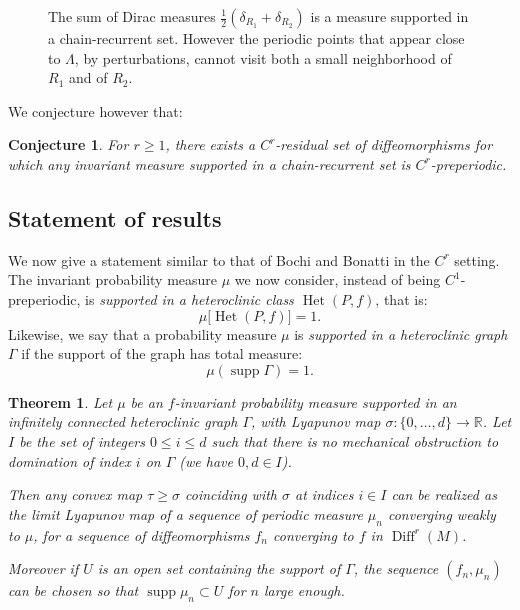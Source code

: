 \documentclass[11pt, a4paper]{amsart}
\theoremstyle{plain}
\newtheorem{theorem}{Theorem} %
\newtheorem{conjecture}{Conjecture}[proposition]
\theoremstyle{definition}
\theoremstyle{remark}
\numberwithin{equation}{section}         %
\DeclareMathOperator{\Diff}{{Diff}}
\DeclareMathOperator*{\supp}{supp}
\def\Diff{\operatorname{Diff}}
\def\Het{\operatorname{Het}}
\begin{document}
\begin{figure}%
\begin{center}
\def\svgwidth{100pt}           %

\end{center}
\caption{\small The sum of Dirac measures $\frac{1}{2}(\delta_{R_1}+\delta_{R_2})$ is a measure supported in a chain-recurrent set. However the periodic points that appear close to $\Lambda$, by perturbations, cannot visit both a small neighborhood of $R_1$ and of $R_2$.}
\label{f.counterex4}
\end{figure} 

We conjecture however that:

\begin{conjecture}
For $r\geq 1$, there exists a $C^r$-residual set of diffeomorphisms for which any invariant measure supported in a chain-recurrent set is $C^r$-preperiodic. 
 \end{conjecture}


\subsection{Statement of results} We now give a statement similar to that of Bochi and Bonatti in the $C^r$ setting. The  invariant probability measure $\mu$ we now consider, instead of being $C^1$-preperiodic, is {\em supported in a heteroclinic class $\Het(P,f)$}, that is:
$$\mu\bigl[\Het(P,f)\bigr]=1.$$
Likewise, we say that a probability measure $\mu$ is {\em supported in a heteroclinic graph $\Gamma$} if the support of the graph has total measure:
 $$\mu(\supp \Gamma)=1.$$
 
 
\begin{theorem}\label{t.bobocr}
Let $\mu$ be an $f$-invariant probability measure supported in an infinitely connected heteroclinic graph $\Gamma$, with Lyapunov map $\sigma\colon \{0,\ldots,d\}\to \mathbb{R}$. Let $I$ be the set of integers $0\leq i\leq d$ such that there is no mechanical obstruction to domination of index $i$ on $\Gamma$ (we have $0,d\in I$). 

Then any convex map $\tau\geq \sigma$ coinciding with $\sigma$ at indices $i\in I$ can be realized as the limit Lyapunov map of a sequence of periodic measure $\mu_n$ converging weakly to $\mu$, for a sequence of diffeomorphisms $f_n$ converging to $f$ in $\Diff^r(M)$.

Moreover if $U$ is an open set containing the support of $\Gamma$, the sequence $(f_n,\mu_n)$ can be chosen so that $\supp \mu_n \subset U$ for $n$ large enough.
\end{theorem}
\end{document}
